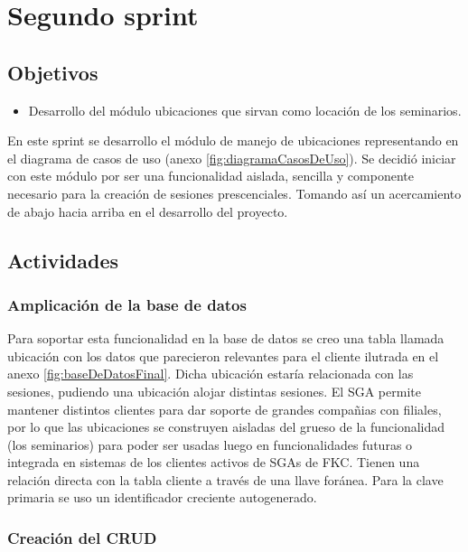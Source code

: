 \section{Segundo sprint} %
\label{sec:segundo_sprint}

\subsection{Objetivos}

\begin{itemize}
	\item Desarrollo del módulo ubicaciones que sirvan como locación de los seminarios.
\end{itemize}

En este sprint se desarrollo el módulo de manejo de ubicaciones representando en el diagrama de casos de uso (anexo \ref{fig:diagramaCasosDeUso}). Se decidió iniciar con este módulo por ser una funcionalidad aislada, sencilla y componente necesario para la creación de sesiones prescenciales. Tomando así un acercamiento de abajo hacia arriba en el desarrollo del proyecto.

\subsection{Actividades} %
\label{sub:actividades2}

\subsubsection{Amplicación de la base de datos}

Para soportar esta funcionalidad en la base de datos se creo una tabla llamada ubicación con los datos que parecieron relevantes para el cliente ilutrada en el anexo \ref{fig:baseDeDatosFinal}. Dicha ubicación estaría relacionada con las sesiones, pudiendo una ubicación alojar distintas sesiones. El SGA permite mantener distintos clientes para dar soporte de grandes compañias con filiales, por lo que las ubicaciones se construyen aisladas del grueso de la funcionalidad (los seminarios) para poder ser usadas luego en funcionalidades futuras o integrada en sistemas de los clientes activos de SGAs de FKC. Tienen una relación directa con la tabla cliente a través de una llave foránea. Para la clave primaria se uso un identificador creciente autogenerado.

\subsubsection{Creación del CRUD}

